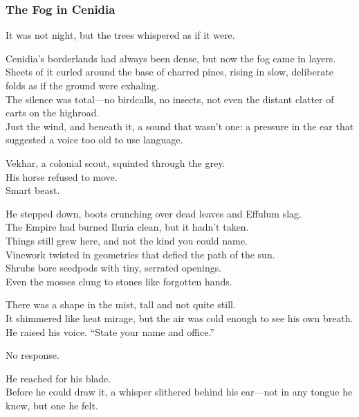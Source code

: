 \documentclass[12pt]{article}
\begin{document}
\vspace{.5in}

\subsubsection*{The Fog in Cenidia}

It was not night, but the trees whispered as if it were.

Cenidia’s borderlands had always been dense, but now the fog came in layers.\\
Sheets of it curled around the base of charred pines, rising in slow, deliberate folds as if the ground were exhaling.\\
The silence was total—no birdcalls, no insects, not even the distant clatter of carts on the highroad.\\
Just the wind, and beneath it, a sound that wasn’t one: a pressure in the ear that suggested a voice too old to use language.

\vspace{1em}

Vekhar, a colonial scout, squinted through the grey.\\
His horse refused to move.\\
Smart beast.

He stepped down, boots crunching over dead leaves and Effulum slag.\\
The Empire had burned Iluria clean, but it hadn’t taken.\\
Things still grew here, and not the kind you could name.\\
Vinework twisted in geometries that defied the path of the sun.\\
Shrubs bore seedpods with tiny, serrated openings.\\
Even the mosses clung to stones like forgotten hands.

\vspace{1em}

There was a shape in the mist, tall and not quite still.\\
It shimmered like heat mirage, but the air was cold enough to see his own breath.\\
He raised his voice. “State your name and office.”

No response.

\vspace{1em}

He reached for his blade.\\
Before he could draw it, a whisper slithered behind his ear—not in any tongue he knew, but one he felt.
\end{document}
